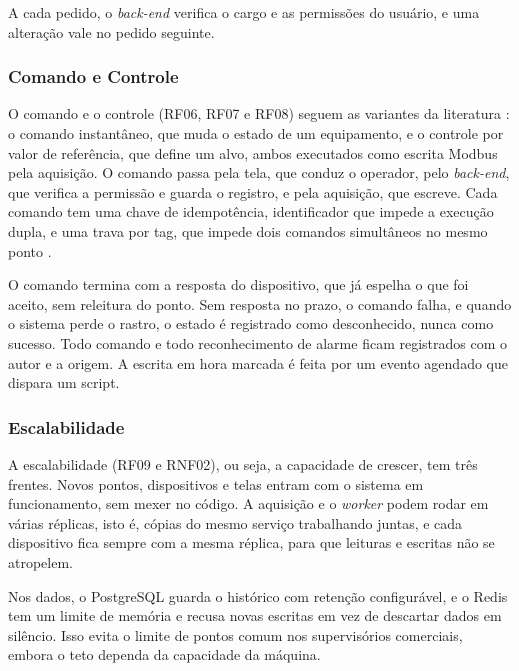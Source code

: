 \par A cada pedido, o \emph{back-end} verifica o cargo e as permissões do usuário, e uma alteração vale no pedido seguinte.

\subsubsection{Comando e Controle}

\par O comando e o controle (RF06, RF07 e RF08) seguem as variantes da literatura \cite{ZANGHI2019_SCADA_CONCEITOS}: o comando instantâneo, que muda o estado de um equipamento, e o controle por valor de referência, que define um alvo, ambos executados como escrita Modbus pela aquisição. O comando passa pela tela, que conduz o operador, pelo \emph{back-end}, que verifica a permissão e guarda o registro, e pela aquisição, que escreve. Cada comando tem uma chave de idempotência, identificador que impede a execução dupla, e uma trava por tag, que impede dois comandos simultâneos no mesmo ponto \cite{STOUFFER2015_NIST_ICS_SECURITY}.

\par O comando termina com a resposta do dispositivo, que já espelha o que foi aceito, sem releitura do ponto. Sem resposta no prazo, o comando falha, e quando o sistema perde o rastro, o estado é registrado como desconhecido, nunca como sucesso. Todo comando e todo reconhecimento de alarme ficam registrados com o autor e a origem. A escrita em hora marcada é feita por um evento agendado que dispara um script.

\subsubsection{Escalabilidade}

\par A escalabilidade (RF09 e RNF02), ou seja, a capacidade de crescer, tem três frentes. Novos pontos, dispositivos e telas entram com o sistema em funcionamento, sem mexer no código. A aquisição e o \emph{worker} podem rodar em várias réplicas, isto é, cópias do mesmo serviço trabalhando juntas, e cada dispositivo fica sempre com a mesma réplica, para que leituras e escritas não se atropelem.

\par Nos dados, o PostgreSQL guarda o histórico com retenção configurável, e o Redis tem um limite de memória e recusa novas escritas em vez de descartar dados em silêncio. Isso evita o limite de pontos comum nos supervisórios comerciais, embora o teto dependa da capacidade da máquina.

